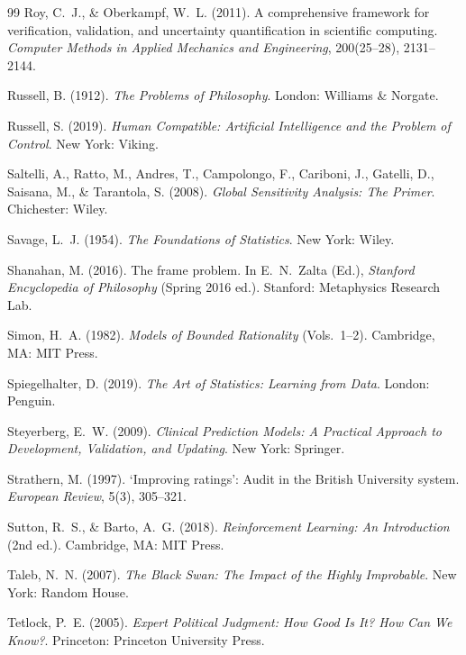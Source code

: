 \documentclass[11pt,a4paper]{article}
\begin{document}
\begin{thebibliography}{99}
Roy, C.~J., \& Oberkampf, W.~L. (2011). A comprehensive framework for
verification, validation, and uncertainty quantification in scientific
computing. \emph{Computer Methods in Applied Mechanics and Engineering},
200(25--28), 2131--2144.

Russell, B. (1912). \emph{The Problems of Philosophy}. London: Williams
\& Norgate.

Russell, S. (2019). \emph{Human Compatible: Artificial Intelligence and
the Problem of Control}. New York: Viking.

Saltelli, A., Ratto, M., Andres, T., Campolongo, F., Cariboni, J.,
Gatelli, D., Saisana, M., \& Tarantola, S. (2008). \emph{Global
Sensitivity Analysis: The Primer}. Chichester: Wiley.

Savage, L.~J. (1954). \emph{The Foundations of Statistics}. New York:
Wiley.

Shanahan, M. (2016). The frame problem. In E.~N.~Zalta (Ed.),
\emph{Stanford Encyclopedia of Philosophy} (Spring 2016 ed.).
Stanford: Metaphysics Research Lab.

Simon, H.~A. (1982). \emph{Models of Bounded Rationality} (Vols.~1--2).
Cambridge, MA: MIT Press.

Spiegelhalter, D. (2019). \emph{The Art of Statistics: Learning from
Data}. London: Penguin.

Steyerberg, E.~W. (2009). \emph{Clinical Prediction Models: A Practical
Approach to Development, Validation, and Updating}. New York: Springer.

Strathern, M. (1997). `Improving ratings': Audit in the British
University system. \emph{European Review}, 5(3), 305--321.

Sutton, R.~S., \& Barto, A.~G. (2018). \emph{Reinforcement Learning: An
Introduction} (2nd ed.). Cambridge, MA: MIT Press.

Taleb, N.~N. (2007). \emph{The Black Swan: The Impact of the Highly
Improbable}. New York: Random House.

Tetlock, P.~E. (2005). \emph{Expert Political Judgment: How Good Is It?
How Can We Know?}. Princeton: Princeton University Press.


\end{thebibliography}
\end{document}
